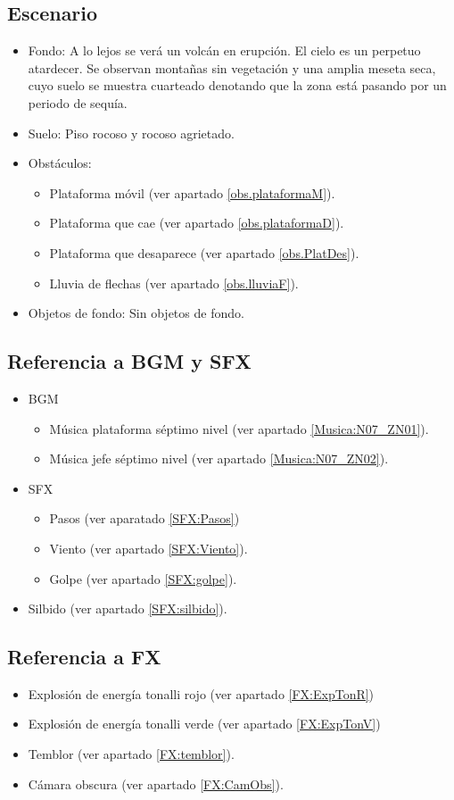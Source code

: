	\subsection{Escenario}
\begin{itemize} 
	\item Fondo: A lo lejos se verá un volcán en erupción. El cielo es un perpetuo atardecer. Se observan montañas sin vegetación y una amplia meseta seca, cuyo suelo se muestra cuarteado denotando que la zona está pasando por un periodo de sequía. 
	\item Suelo: Piso rocoso y rocoso agrietado.
	\item Obstáculos:
	\begin{itemize}
	\item Plataforma móvil (ver apartado \ref{obs.plataformaM}).
			\item Plataforma que cae (ver apartado \ref{obs.plataformaD}).
			\item Plataforma que desaparece (ver apartado \ref{obs.PlatDes}).
			\item Lluvia de flechas (ver apartado \ref{obs.lluviaF}).
\end{itemize}	 
	
	\item Objetos de fondo: Sin objetos de fondo.
\end{itemize}	
	\subsection{Referencia a BGM y SFX}
	\begin{itemize}
		\item BGM
			\begin{itemize}
				\item Música plataforma séptimo nivel (ver apartado \ref{Musica:N07_ZN01}).
				\item Música jefe séptimo nivel (ver apartado \ref{Musica:N07_ZN02}).
			\end{itemize}
		\item SFX
			\begin{itemize}
				\item Pasos (ver aparatado \ref{SFX:Pasos})
				\item Viento (ver apartado \ref{SFX:Viento}).
				\item Golpe (ver apartado \ref{SFX:golpe}).
			\end{itemize}
			\item Silbido (ver apartado \ref{SFX:silbido}).
	\end{itemize}
	\subsection{Referencia a FX}
	\begin{itemize}
		\item Explosión de energía tonalli rojo (ver apartado \ref{FX:ExpTonR})
	\item Explosión de energía tonalli verde (ver apartado \ref{FX:ExpTonV})
	\item Temblor (ver apartado \ref{FX:temblor}).
	\item Cámara obscura (ver apartado \ref{FX:CamObs}).
	\end{itemize}
	